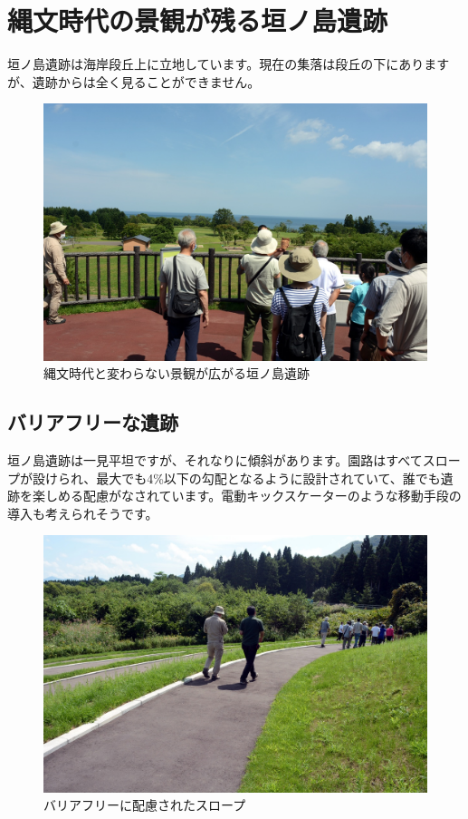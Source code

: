 \documentclass[a4j,11pt,twocolumn,openany]{jsbook}
\begin{document}
\section{縄文時代の景観が残る垣ノ島遺跡}

垣ノ島遺跡は海岸段丘上に立地しています。現在の集落は段丘の下にありますが、遺跡からは全く見ることができません。

\begin{figure}[ht]
	\centering
	\includegraphics[width=\linewidth]{fig/01_Iseki_kengaku/12_Kakinosima_zenkei.JPG}
	\caption{
		縄文時代と変わらない景観が広がる垣ノ島遺跡}
	\label{}
\end{figure}

\subsection{バリアフリーな遺跡}

垣ノ島遺跡は一見平坦ですが、それなりに傾斜があります。園路はすべてスロープが設けられ、最大でも4\%以下の勾配となるように設計されていて、誰でも遺跡を楽しめる配慮がなされています。電動キックスケーターのような移動手段の導入も考えられそうです。

\begin{figure}[ht]
	\centering
	\includegraphics[width=\linewidth]{fig/01_Iseki_kengaku/13Kakinosima_slope.JPG}
	\caption{バリアフリーに配慮されたスロープ}
	\label{}
\end{figure}
\end{document}
